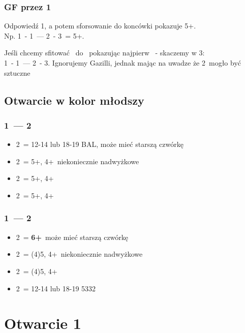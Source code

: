 \documentclass[12pt, a4paper]{article}
\begin{document}
\subsubsection*{GF przez 1\spades}
    Odpowiedź 1\spades, a potem sforsowanie do koncówki pokazuje 5+\spades. \\
    Np. 1\diams\ - 1\spades\ --- 2\diams\ - 3\clubs\ = 5+\spades. \br

    Jeśli chcemy sfitować \hearts\ do \gf\ pokazując najpierw \spades\ - skaczemy w 3\hearts:\\
    1\hearts\ - 1\spades\ --- 2\clubs\ - 3\hearts. Ignorujemy Gazilli, jednak mając na uwadze że 2\clubs\ mogło być sztuczne

\pagebreak
\subsection*{Otwarcie w kolor młodszy}
\subsubsection*{1\clubs\ --- 2\clubs}
\begin{itemize}
    \item 2\diams\ = 12-14 lub 18-19 BAL, może mieć starszą czwórkę \imp
    \item 2\hearts\ = 5+\clubs, 4+\hearts\ niekoniecznie nadwyżkowe
    \item 2\spades\ = 5+\clubs, 4+\spades 
    \item 2\nt\ = 5+\clubs, 4+\diams \vimp
\end{itemize}

\subsubsection*{1\diams\ --- 2\clubs}
\begin{itemize}
    \item 2\diams\ = \textbf{6+}\diams\ może mieć starszą czwórkę \imp
    \item 2\hearts\ = (4)5\diams, 4+\hearts\ niekoniecznie nadwyżkowe
    \item 2\spades\ = (4)5\diams, 4+\spades 
    \item 2\nt\ = 12-14 lub 18-19 5332
\end{itemize}



\pagebreak
\section{Otwarcie 1\clubs}
\end{document}
